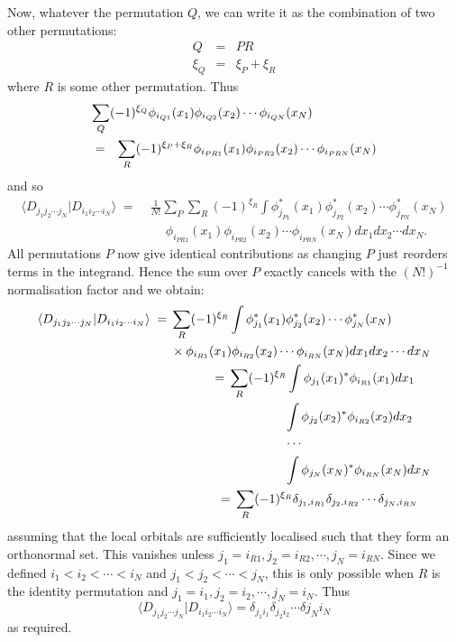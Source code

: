 \documentclass{article}
\newcommand{\bra}{\langle}
\newcommand{\ket}{\rangle}
\begin{document}
Now, whatever the permutation $Q$, we can write it as the combination of two other permutations:
\begin{eqnarray*}
Q & = & PR \\
\xi_Q & = & \xi_P + \xi_R
\end{eqnarray*}
where $R$ is some other permutation.  Thus
\begin{eqnarray*}
\lefteqn{
\sum_Q (-1)^{\xi_Q} \phi_{i_{Q1}}(x_1) \phi_{i_{Q2}}(x_2) \cdots
\phi_{i_{QN}}(x_N) } \nonumber \\
& = & \sum_R 
(-1)^{\xi_P + \xi_R} \phi_{i_{PR1}}(x_1) \phi_{i_{PR2}}(x_2) \cdots \phi_{i_{PRN}}(x_N) 
\end{eqnarray*}
and so 
\begin{displaymath}
\begin{split}
\bra D_{j_1j_2\cdots j_N} | D_{i_1i_2\cdots i_N} \ket \; = \; & \frac{1}{N!} \sum_P \sum_R (-1)^{\xi_R}
\int 
\phi_{j_{P1}}^*(x_1) \phi_{j_{P2}}^*(x_2) \cdots \phi_{j_{PN}}^*(x_N) \\
& \quad\ \phi_{i_{PR1}}(x_1) \phi_{i_{PR2}}(x_2) \cdots \phi_{i_{PRN}}(x_N) 
dx_1 dx_2 \cdots dx_N.
\end{split}
\end{displaymath}
All permutations $P$ now give identical contributions as changing $P$ just reorders terms in the integrand.  Hence the sum over $P$ exactly cancels with the $(N!)^{-1}$ normalisation factor and we obtain:
\begin{align*}
\begin{split}
\bra D_{j_1j_2\cdots j_N} | D_{i_1i_2\cdots i_N} \ket \; = \; &
\sum_R (-1)^{\xi_R} \int
\phi_{j_{1}}^*(x_1) \phi_{j_{2}}^*(x_2) \cdots \phi_{j_{N}}^*(x_N) \\
& \times \phi_{i_{R1}}(x_1) \phi_{i_{R2}}(x_2) \cdots \phi_{i_{RN}}(x_N) 
dx_1 dx_2 \cdots dx_N
\end{split} \\
\begin{split}
\; = \; &
\sum_R (-1)^{\xi_R} 
\int \phi_{j_{1}}(x_1)^* \phi_{i_{R1}}(x_1) dx_1 \\
& \hphantom{\sum_R (-1)^{\xi_R}}
\int \phi_{j_{2}}(x_2)^* \phi_{i_{R2}}(x_2) dx_2 \\
& \hphantom{\sum_R (-1)^{\xi_R}}
\cdots \\
& \hphantom{\sum_R (-1)^{\xi_R}}
\int \phi_{j_{N}}(x_N)^* \phi_{i_{RN}}(x_N) dx_N 
\end{split} \\
\begin{split}
\; = \; & \sum_R (-1)^{\xi_R} 
\delta_{j_1,i_{R1}}
\delta_{j_2,i_{R2}}
\cdots
\delta_{j_N,i_{RN}}
\end{split}
\end{align*}
assuming that the local orbitals are sufficiently localised such that they form an orthonormal set.  This vanishes unless $j_1=i_{R1}, j_2=i_{R2}, \cdots, j_N=i_{RN}$.  Since we defined $i_1<i_2<\cdots<i_N$ and $j_1<j_2<\cdots<j_N$, this is only possible when $R$ is the identity permutation and $j_1=i_1, j_2=i_2, \cdots, j_N=i_N$.  Thus
\begin{displaymath}
\bra D_{j_1j_2\cdots j_N} | D_{i_1i_2\cdots i_N} \ket = \delta_{j_1i_1} \delta_{j_2i_2} \cdots \delta{j_Ni_N}
\end{displaymath}
as required.
\end{document}
